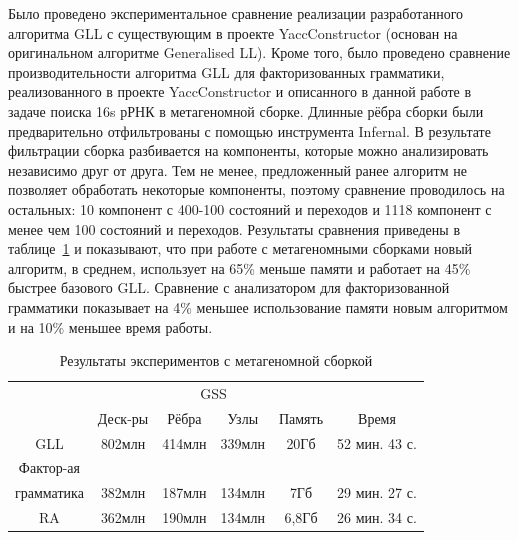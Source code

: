 \documentclass[14pt]{matmex-diploma-custom}
\begin{document}
    Было проведено экспериментальное сравнение реализации разработанного алгоритма GLL с
    существующим в проекте YaccConstructor (основан на оригинальном алгоритме Generalised LL). 
    Кроме того, было проведено сравнение производительности алгоритма GLL для факторизованных грамматики, реализованного в 
    проекте YaccConstructor и описанного в данной 
    работе в задаче поиска 16s рРНК в метагеномной сборке. Длинные рёбра сборки были предварительно отфильтрованы с помощью
    инструмента Infernal. В результате фильтрации сборка разбивается на компоненты, которые можно анализировать независимо друг от
    друга. Тем не менее, предложенный ранее алгоритм не позволяет обработать некоторые компоненты, поэтому сравнение проводилось
    на остальных: 10 компонент с 400-100 состояний и переходов и 1118 компонент с менее чем 100 состояний и переходов.
    Результаты сравнения приведены в таблице~\ref{expTable1} и показывают, что при работе с метагеномными сборками новый
    алгоритм, в среднем, использует на 65\% меньше памяти и работает на 45\% быстрее базового GLL. Сравнение с анализатором 
    для факторизованной грамматики показывает на 4\% меньшее использование памяти новым алгоритмом и на 10\% меньшее время работы.
    
    \begin{table}[h]
        \begin{center}
        \begin{tabular}{ | c | c | c | c | c | c |}
            \hline
            & &\multicolumn{2}{c|}{GSS} & & \\
            \cline{3-4}
                              & Деск-ры & Рёбра   & Узлы   & Память& Время   \\ \hline
            GLL               &  802млн &  414млн & 339млн  & 20Гб & 52 мин. 43 с.  \\ \hline
            Фактор-ая &&&&&\\
            грамматика        &  382млн &  187млн & 134млн & 7Гб & 29 мин. 27 с.  \\ \hline
            RA                &  362млн &  190млн & 134млн & 6,8Гб & 26 мин. 34 с.  \\ \hline %
        \end{tabular}
        \caption{Результаты экспериментов с метагеномной сборкой}
        \label{expTable1}
        \end{center}
    \end{table}
	
\end{document}
